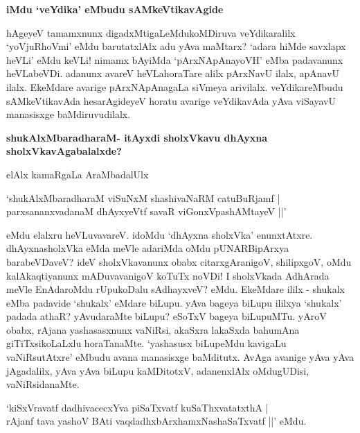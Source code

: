 {\bf iMdu `veYdika' eMbudu sAMkeVtikavAgide}

hAgeyeV tamamxnunx digadxMtigaLeMdukoMDiruva veYdikaralilx `yoVjuRhoVmi' eMdu barutatxlAlx adu yAva maMtarx? `adara hiMde savxlapx heVLi' eMdu keVLi! nimamx bAyiMda `pArxNApAnayoVH' eMba padavanunx heVLabeVDi. adanunx avareV heVLahoraTare alilx pArxNavU ilalx, apAnavU ilalx. EkeMdare avarige pArxNApAnagaLa siVmeya arivilalx. veYdikareMbudu sAMkeVtikavAda hesarAgideyeV horatu avarige veYdikavAda yAva viSayavU manasisxge baMdiruvudilalx.

{\bf shukAlxMbaradharaM- itAyxdi sholxVkavu dhAyxna sholxVkavAgabalalxde?}

elAlx kamaRgaLa AraMbadalUlx

\begin{shloka}
`shukAlxMbaradharaM viSuNxM shashivaNaRM catuBuRjamf |\\
parxsananxvadanaM dhAyxyeVtf savaR viGonxVpashAMtayeV ||'
\end{shloka}

eMdu elalxru heVLuvavareV. idoMdu `dhAyxna sholxVka' enunxtAtxre. dhAyxnasholxVka eMda meVle adariMda oMdu pUNARBipArxya barabeVDaveV? ideV sholxVkavanunx obabx citarxgAranigoV, shilipxgoV, oMdu kalAkaqtiyanunx mADuvavanigoV koTuTx noVDi! I sholxVkada AdhArada meVle EnAdaroMdu rUpukoDalu sAdhayxveV? eMdu. EkeMdare ililx - shukalx eMba padavide `shukalx' eMdare biLupu. yAva bageya biLupu ililxya `shukalx' padada athaR? yAvudaraMte biLupu? eSoTxV bageya biLupuMTu. yAroV obabx, rAjana yashasasxnunx vaNiRsi, akaSxra lakaSxda bahumAna giTiTxsikoLaLxlu horaTanaMte. `yashasusx biLupeMdu kavigaLu vaNiRsutAtxre' eMbudu avana manasisxge baMditutx. AvAga avanige yAva yAva jAgadalilx, yAva yAva biLupu kaMDitotxV, adanenxlAlx oMdugUDisi, vaNiRsidanaMte.

\begin{shloka}
`kiSxVravatf dadhivacecxYva piSaTxvatf kuSaThxvatatxthA |\\
rAjanf tava yashoV BAti vaqdadhxbArxhamxNashaSaTxvatf ||' eMdu.
\end{shloka}

